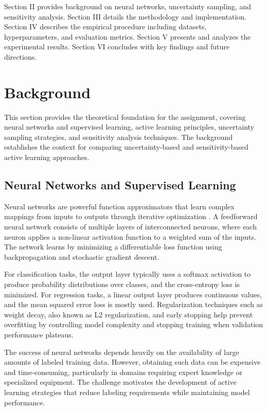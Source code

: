 \documentclass[conference]{IEEEtran}
\begin{document}
Section II provides background on neural networks, uncertainty sampling, and sensitivity analysis. Section III details the methodology and implementation. Section IV describes the empirical procedure including datasets, hyperparameters, and evaluation metrics. Section V presents and analyzes the experimental results. Section VI concludes with key findings and future directions.

\section{Background}

This section provides the theoretical foundation for the assignment, covering neural networks and supervised learning, active learning principles, uncertainty sampling strategies, and sensitivity analysis techniques. The background establishes the context for comparing uncertainty-based and sensitivity-based active learning approaches.

\subsection{Neural Networks and Supervised Learning}

Neural networks are powerful function approximators that learn complex mappings from inputs to outputs through iterative optimization \cite{gal2017deep}. A feedforward neural network consists of multiple layers of interconnected neurons, where each neuron applies a non-linear activation function to a weighted sum of the inputs. The network learns by minimizing a differentiable loss function using backpropagation and stochastic gradient descent.

For classification tasks, the output layer typically uses a softmax activation to produce probability distributions over classes, and the cross-entropy loss is minimized. For regression tasks, a linear output layer produces continuous values, and the mean squared error loss is mostly used. Regularization techniques such as weight decay, also known as L2 regularization, and early stopping help prevent overfitting by controlling model complexity and stopping training when validation performance plateaus.

The success of neural networks depends heavily on the availability of large amounts of labeled training data. However, obtaining such data can be expensive and time-consuming, particularly in domains requiring expert knowledge or specialized equipment. The challenge motivates the development of active learning strategies that reduce labeling requirements while maintaining model performance.
\end{document}
